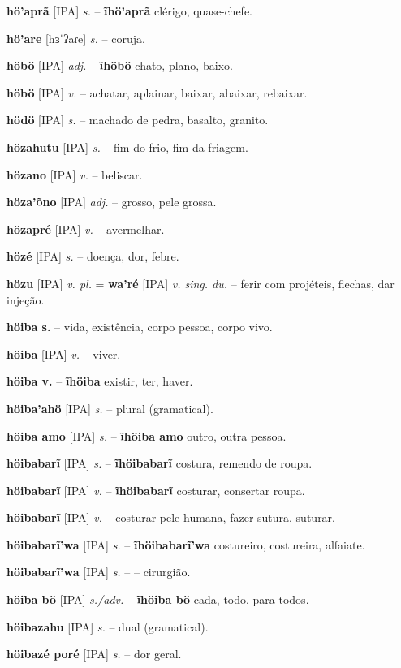 \textbf{hö'aprã} [IPA] \textit{s.} -- \textbf{ĩhö'aprã} clérigo, quase-chefe.

\textbf{hö'are} [hɜˈʔaɾe] \textit{s.} -- coruja.

\textbf{höbö} [IPA] \textit{adj.} -- \textbf{ĩhöbö} chato, plano, baixo.

\textbf{höbö} [IPA] \textit{v.} -- achatar, aplainar, baixar, abaixar, rebaixar.

\textbf{hödö} [IPA] \textit{s.} -- machado de pedra, basalto, granito.

\textbf{hözahutu} [IPA] \textit{s.} -- fim do frio, fim da friagem.

\textbf{hözano} [IPA] \textit{v.} -- beliscar.

\textbf{höza'õno} [IPA] \textit{adj.} -- grosso, pele grossa.

\textbf{hözapré} [IPA] \textit{v.} -- avermelhar.

\textbf{hözé} [IPA] \textit{s.} -- doença, dor, febre.

\textbf{hözu} [IPA] \textit{v. pl.} = \textbf{wa'ré} [IPA] \textit{v. sing. du.} -- ferir com projéteis, flechas, dar injeção.

\textbf{höiba s.} -- vida, existência, corpo pessoa, corpo vivo.

\textbf{höiba} [IPA] \textit{v.} -- viver.

\textbf{höiba v.} -- \textbf{ĩhöiba} existir, ter, haver.

\textbf{höiba'ahö} [IPA] \textit{s.} -- plural (gramatical).

\textbf{höiba amo} [IPA] \textit{s.} -- \textbf{ĩhöiba amo} outro, outra pessoa.

\textbf{höibabarĩ} [IPA] \textit{s.} -- \textbf{ĩhöibabarĩ} costura, remendo de roupa.

\textbf{höibabarĩ} [IPA] \textit{v.} -- \textbf{ĩhöibabarĩ} costurar, consertar roupa.

\textbf{höibabarĩ} [IPA] \textit{v.} -- costurar pele humana, fazer sutura, suturar.

\textbf{höibabarĩ'wa} [IPA] \textit{s.} -- \textbf{ĩhöibabarĩ'wa} costureiro, costureira, alfaiate.

\textbf{höibabarĩ'wa} [IPA] \textit{s.} -- -- cirurgião.

\textbf{höiba bö} [IPA] \textit{s./adv.} -- \textbf{ĩhöiba bö} cada, todo, para todos.

\textbf{höibazahu} [IPA] \textit{s.} -- dual (gramatical).

\textbf{höibazé poré} [IPA] \textit{s.} -- dor geral.

